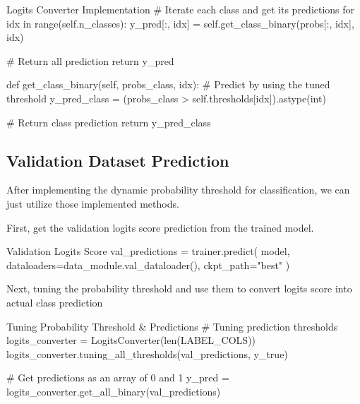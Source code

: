 \documentclass[12pt, a4paper]{article}
\begin{document}
\begin{codeblock}{Logits Converter Implementation}
                            # Iterate each class and get its predictions
                            for idx in range(self.n_classes):
                                y_pred[:, idx] = self.get_class_binary(probs[:, idx], idx)

                            # Return all prediction
                            return y_pred

                        def get_class_binary(self, probs_class, idx):
                            # Predict by using the tuned threshold
                            y_pred_class = (probs_class > self.thresholds[idx]).astype(int)

                            # Return class prediction
                            return y_pred_class
                \end{codeblock}

            \subsection{Validation Dataset Prediction}
                After implementing the dynamic probability threshold for classification,
                we can just utilize those implemented methods.

                \vspace{0.5em}

                \noindent First, get the validation logits score prediction from the trained model.
                \begin{codeblock}{Validation Logits Score}
                    val_predictions = trainer.predict(
                        model, dataloaders=data_module.val_dataloader(), ckpt_path="best"
                    )
                \end{codeblock}

                Next, tuning the probability threshold and use them to convert logits score into actual class prediction
                \begin{codeblock}{Tuning Probability Threshold \& Predictions}
                    # Tuning prediction thresholds
                    logits_converter = LogitsConverter(len(LABEL_COLS))
                    logits_converter.tuning_all_thresholds(val_predictions, y_true)

                    # Get predictions as an array of 0 and 1
                    y_pred = logits_converter.get_all_binary(val_predictions)
                \end{codeblock}
\end{document}
